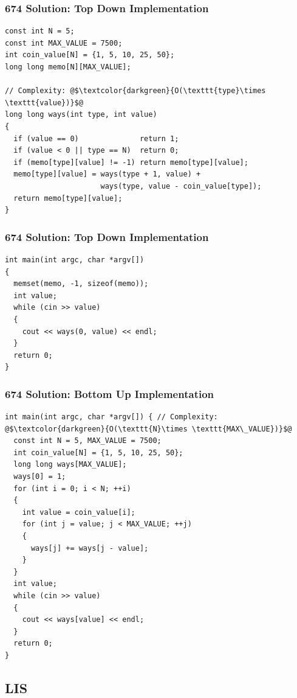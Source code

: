 \documentclass{beamer}
\newcounter{exo}
\begin{document}
\begin{frame}[containsverbatim]
\frametitle{674 Solution: Top Down Implementation}

\scriptsize
\begin{lstlisting}
const int N = 5;
const int MAX_VALUE = 7500;
int coin_value[N] = {1, 5, 10, 25, 50};
long long memo[N][MAX_VALUE];

// Complexity: @$\textcolor{darkgreen}{O(\texttt{type}\times \texttt{value})}$@
long long ways(int type, int value)
{
  if (value == 0)              return 1;
  if (value < 0 || type == N)  return 0;
  if (memo[type][value] != -1) return memo[type][value];
  memo[type][value] = ways(type + 1, value) +
                      ways(type, value - coin_value[type]);
  return memo[type][value];
}
\end{lstlisting}

\end{frame}

\begin{frame}[containsverbatim]
\frametitle{674 Solution: Top Down Implementation}

\scriptsize
\begin{lstlisting}
int main(int argc, char *argv[])
{
  memset(memo, -1, sizeof(memo));
  int value;
  while (cin >> value)
  {
    cout << ways(0, value) << endl;
  }
  return 0;
}
\end{lstlisting}

\end{frame}

\begin{frame}[containsverbatim]
\frametitle{674 Solution: Bottom Up Implementation}

\scriptsize
\begin{lstlisting}
int main(int argc, char *argv[]) { // Complexity: @$\textcolor{darkgreen}{O(\texttt{N}\times \texttt{MAX\_VALUE})}$@
  const int N = 5, MAX_VALUE = 7500;
  int coin_value[N] = {1, 5, 10, 25, 50};
  long long ways[MAX_VALUE];
  ways[0] = 1;
  for (int i = 0; i < N; ++i)
  {
    int value = coin_value[i];
    for (int j = value; j < MAX_VALUE; ++j)
    {
      ways[j] += ways[j - value];
    }
  }
  int value;
  while (cin >> value)
  {
    cout << ways[value] << endl;
  }
  return 0;
}
\end{lstlisting}

\end{frame}

\fi


\subsection{LIS}
\end{document}
